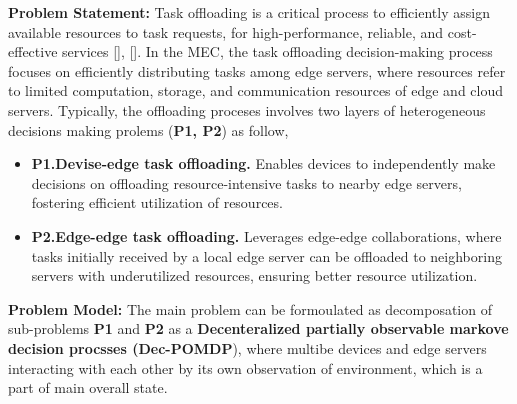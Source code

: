 \documentclass[12pt]{article}
\begin{document}
\vspace{2mm}

\noindent\textbf{\large Problem Statement: }
\noindent
Task offloading is a critical process to efficiently assign available resources to task requests, for high-performance, reliable, and cost-effective services [], []. In the MEC, the task offloading decision-making process focuses on efficiently distributing tasks among edge servers, where resources refer to limited computation, storage, and communication resources of edge and cloud servers. Typically, the offloading proceses involves two layers of heterogeneous decisions making prolems (\textbf{P1, P2}) as follow,
\vspace{-2mm}
\begin{itemize}
	\item\textbf{P1.\hspace{2mm}Devise-edge task offloading.} Enables devices to independently make decisions on offloading resource-intensive tasks to nearby edge servers, fostering efficient utilization of resources.\vspace{-2mm}
	\item\textbf{P2.\hspace{2mm}Edge-edge task offloading.} Leverages edge-edge collaborations, where tasks initially received by a local edge server can be offloaded to neighboring servers with underutilized resources, ensuring better resource utilization. %
\end{itemize}

\noindent\textbf{\large Problem Model: }
\noindent
The main problem can be formoulated as decomposation of sub-problems \textbf{P1} and \textbf{P2} as a \textbf{Decenteralized partially observable markove decision procsses (Dec-POMDP}), where multibe devices and edge servers interacting with each other by its own observation of environment, which is a part of main overall state. 

\vspace{3mm}
\end{document}
